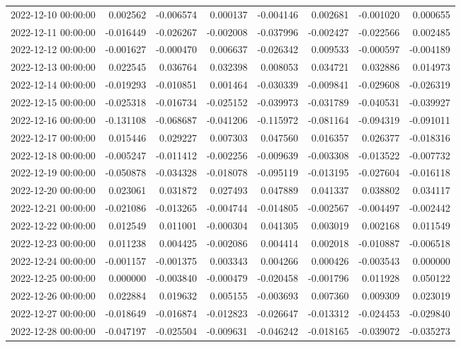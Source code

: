 \begin{tabular}{lrrrrrrr}
2022-12-10 00:00:00 & 0.002562 & -0.006574 & 0.000137 & -0.004146 & 0.002681 & -0.001020 & 0.000655 \\
2022-12-11 00:00:00 & -0.016449 & -0.026267 & -0.002008 & -0.037996 & -0.002427 & -0.022566 & 0.002485 \\
2022-12-12 00:00:00 & -0.001627 & -0.000470 & 0.006637 & -0.026342 & 0.009533 & -0.000597 & -0.004189 \\
2022-12-13 00:00:00 & 0.022545 & 0.036764 & 0.032398 & 0.008053 & 0.034721 & 0.032886 & 0.014973 \\
2022-12-14 00:00:00 & -0.019293 & -0.010851 & 0.001464 & -0.030339 & -0.009841 & -0.029608 & -0.026319 \\
2022-12-15 00:00:00 & -0.025318 & -0.016734 & -0.025152 & -0.039973 & -0.031789 & -0.040531 & -0.039927 \\
2022-12-16 00:00:00 & -0.131108 & -0.068687 & -0.041206 & -0.115972 & -0.081164 & -0.094319 & -0.091011 \\
2022-12-17 00:00:00 & 0.015446 & 0.029227 & 0.007303 & 0.047560 & 0.016357 & 0.026377 & -0.018316 \\
2022-12-18 00:00:00 & -0.005247 & -0.011412 & -0.002256 & -0.009639 & -0.003308 & -0.013522 & -0.007732 \\
2022-12-19 00:00:00 & -0.050878 & -0.034328 & -0.018078 & -0.095119 & -0.013195 & -0.027604 & -0.016118 \\
2022-12-20 00:00:00 & 0.023061 & 0.031872 & 0.027493 & 0.047889 & 0.041337 & 0.038802 & 0.034117 \\
2022-12-21 00:00:00 & -0.021086 & -0.013265 & -0.004744 & -0.014805 & -0.002567 & -0.004497 & -0.002442 \\
2022-12-22 00:00:00 & 0.012549 & 0.011001 & -0.000304 & 0.041305 & 0.003019 & 0.002168 & 0.011549 \\
2022-12-23 00:00:00 & 0.011238 & 0.004425 & -0.002086 & 0.004414 & 0.002018 & -0.010887 & -0.006518 \\
2022-12-24 00:00:00 & -0.001157 & -0.001375 & 0.003343 & 0.004266 & 0.000426 & -0.003543 & 0.000000 \\
2022-12-25 00:00:00 & 0.000000 & -0.003840 & -0.000479 & -0.020458 & -0.001796 & 0.011928 & 0.050122 \\
2022-12-26 00:00:00 & 0.022884 & 0.019632 & 0.005155 & -0.003693 & 0.007360 & 0.009309 & 0.023019 \\
2022-12-27 00:00:00 & -0.018649 & -0.016874 & -0.012823 & -0.026647 & -0.013312 & -0.024453 & -0.029840 \\
2022-12-28 00:00:00 & -0.047197 & -0.025504 & -0.009631 & -0.046242 & -0.018165 & -0.039072 & -0.035273 \\

\end{tabular}
